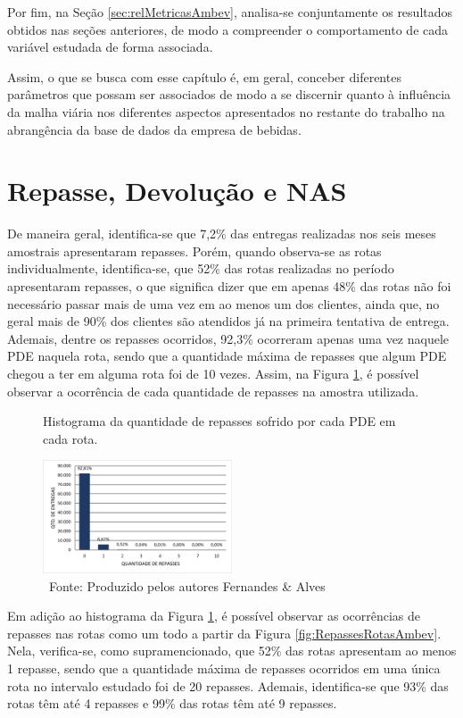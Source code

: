 Por fim, na Seção \ref{sec:relMetricasAmbev}, analisa-se conjuntamente os resultados obtidos nas seções anteriores, de modo a compreender o comportamento de cada variável estudada de forma associada.

Assim, o que se busca com esse capítulo é, em geral, conceber diferentes parâmetros que possam ser associados de modo a se discernir quanto à influência da malha viária nos diferentes aspectos apresentados no restante do trabalho na abrangência da base de dados da empresa de bebidas.

\section{Repasse, Devolução e NAS} \label{sec:indicadoresAmbev}

De maneira geral, identifica-se que 7,2\% das entregas realizadas nos seis meses amostrais apresentaram repasses.
Porém, quando observa-se as rotas individualmente, identifica-se, que 52\% das rotas realizadas no período apresentaram repasses, o que significa dizer que em apenas 48\% das rotas não foi necessário passar mais de uma vez em ao menos um dos clientes, ainda que, no geral mais de 90\% dos clientes são atendidos já na primeira tentativa de entrega.
Ademais, dentre os repasses ocorridos, 92,3\% ocorreram apenas uma vez naquele PDE naquela rota, sendo que a quantidade máxima de repasses que algum PDE chegou a ter em alguma rota foi de 10 vezes. 
Assim, na Figura \ref{fig:Repasses}, é possível observar a ocorrência de cada quantidade de repasses na amostra utilizada.

\begin{figure}[htb]
    \centering
    \caption{Histograma da quantidade de repasses sofrido por cada PDE em cada rota.}
    \includegraphics[width=0.5\textwidth]{images/5_emp_bebidas/excel_based/qtde_repasses1.png}
    \caption*{\ Fonte: Produzido pelos autores Fernandes \& Alves}
    \label{fig:Repasses}
\end{figure}

Em adição ao histograma da Figura \ref{fig:Repasses}, é possível observar as ocorrências de repasses nas rotas como um todo a partir da Figura \ref{fig:RepassesRotasAmbev}.
Nela, verifica-se, como supramencionado, que 52\% das rotas apresentam ao menos 1 repasse, sendo que a quantidade máxima de repasses ocorridos em uma única rota no intervalo estudado foi de 20 repasses.
Ademais, identifica-se que 93\% das rotas têm até 4 repasses e 99\% das rotas têm até 9 repasses.

